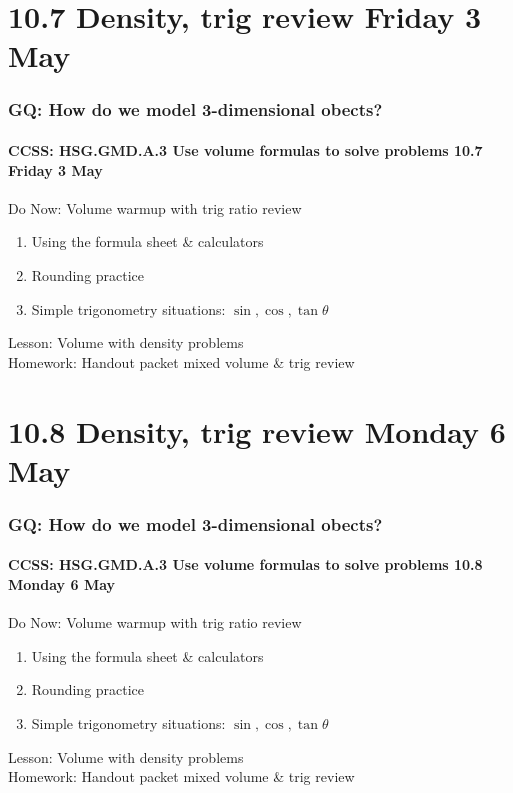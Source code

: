 \documentclass{beamer}
\begin{document}
\section{10.7 Density, trig review Friday 3 May}
  \frame
  {
    \frametitle{GQ: How do we model 3-dimensional obects?}
    \framesubtitle{CCSS: HSG.GMD.A.3 Use volume formulas to solve problems \hfill \alert{10.7 Friday 3 May}}
    \begin{block}{Do Now: Volume warmup with trig ratio review}
      \begin{enumerate}
        \item Using the formula sheet \& calculators
        \item Rounding practice
        \item Simple trigonometry situations: $\sin, \cos, \tan \theta$
    \end{enumerate}
    \end{block}
    Lesson: Volume with density problems\\[1cm]
    Homework: Handout packet mixed volume \& trig review
  }

  \section{10.8 Density, trig review Monday 6 May}
    \frame
    {
      \frametitle{GQ: How do we model 3-dimensional obects?}
      \framesubtitle{CCSS: HSG.GMD.A.3 Use volume formulas to solve problems \hfill \alert{10.8 Monday 6 May}}
      \begin{block}{Do Now: Volume warmup with trig ratio review}
        \begin{enumerate}
          \item Using the formula sheet \& calculators
          \item Rounding practice
          \item Simple trigonometry situations: $\sin, \cos, \tan \theta$
      \end{enumerate}
      \end{block}
      Lesson: Volume with density problems\\[1cm]
      Homework: Handout packet mixed volume \& trig review
    }
\end{document}
